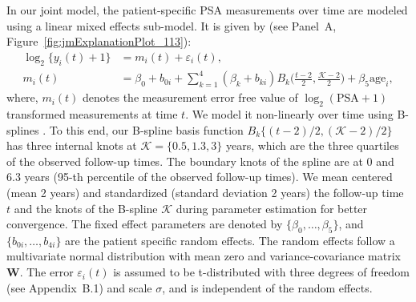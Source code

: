 In our joint model, the patient-specific PSA measurements over time are modeled using a linear mixed effects sub-model. It is given by (see Panel~A, Figure~\ref{fig:jmExplanationPlot_113}):
\begin{equation}
\label{eq:long_model_psa}
\begin{split}
    \log_2 \big\{y_{i}(t) + 1\big\} &= m_{i}(t) + \varepsilon_{i}(t),\\
    m_{i}(t) &= \beta_{0} + b_{0i} + \sum_{k=1}^4 (\beta_{k} + b_{ki})  B_k\Big(\frac{t-2}{2},\frac{\mathcal{K}-2}{2}\Big) + \beta_{5} \mbox{age}_i,
    \end{split}
\end{equation}
where, $m_{i}(t)$ denotes the measurement error free value of $\log_2 (\mbox{PSA} + 1)$ transformed \citep{pearson1994mixed,lin2000latent} measurements at time $t$. We model it non-linearly over time using B-splines \citep{de1978practical}. To this end, our B-spline basis function ${B_k\{(t-2)/2,(\mathcal{K}-2)/2\}}$ has three internal knots at $\mathcal{K} = \{0.5, 1.3, 3\}$ years, which are the three quartiles of the observed follow-up times. The boundary knots of the spline are at 0 and 6.3 years (95-th percentile of the observed follow-up times). We mean centered (mean 2 years) and standardized (standard deviation 2 years) the follow-up time $t$ and the knots of the B-spline $\mathcal{K}$ during parameter estimation for better convergence. The fixed effect parameters are denoted by ${\{\beta_{0},\ldots,\beta_{5}\}}$, and ${\{b_{0i}, \ldots, b_{4i}\}}$ are the patient specific random effects. The random effects follow a multivariate normal distribution with mean zero and variance-covariance matrix $\boldsymbol{W}$. The error $\varepsilon_{i}(t)$ is assumed to be t-distributed with three degrees of freedom (see Appendix~B.1) and scale $\sigma$, and is independent of the random effects. 

